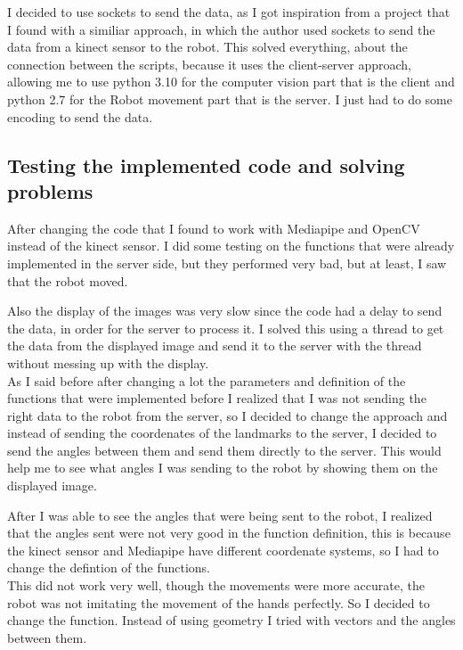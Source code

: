 \documentclass[conference]{IEEEtran}
\begin{document}
I decided to use sockets to send the data, as I got inspiration from a project that I found with a similiar approach, in which the author used sockets to send the data from a kinect sensor to the robot.
This solved everything, about the connection between the scripts, because it uses the client-server approach, allowing me to use python 3.10 for the computer vision part that is the client and python 2.7 for the Robot movement part that is the server. I just had to do some encoding to send the data. 

\subsection{Testing the implemented code and solving problems}
After changing the code that I found to work with Mediapipe and OpenCV instead of the kinect sensor. I did some testing on the functions that were already implemented in the server side, but they performed very bad, but at least, I saw that the robot moved.

Also the display of the images was very slow since the code had a delay to send the data, in order for the server to process it. I solved this using a thread to get the data from the displayed image and send it to the server with the thread without messing up with the display.
\\
As I said before after changing a lot the parameters and definition of the functions that were implemented before I realized that I was not sending the right data to the robot from the server, so I decided to change the approach and instead of sending the coordenates of the landmarks to the server, I decided to send the angles between them and send them directly to the server. This would help me to see what angles I was sending to the robot by showing them on the displayed image.

After I was able to see the angles that were being sent to the robot, I realized that the angles sent were not very good in the function definition, this is because the kinect sensor and Mediapipe have different coordenate systems, so I had to change the defintion of the functions.
\\
This did not work very well, though the movements were more accurate, the robot was not imitating the movement of the hands perfectly. So I decided to change the function. Instead of using geometry I tried with vectors and the angles between them.
\end{document}
